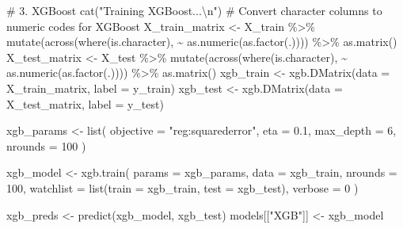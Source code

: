 \documentclass[
  letterpaper,
  DIV=11,
  numbers=noendperiod]{scrreprt}
\newenvironment{Shaded}{\begin{snugshade}}{\end{snugshade}}
\newcommand{\AttributeTok}[1]{\textcolor[rgb]{0.40,0.45,0.13}{#1}}
\newcommand{\CommentTok}[1]{\textcolor[rgb]{0.37,0.37,0.37}{#1}}
\newcommand{\DecValTok}[1]{\textcolor[rgb]{0.68,0.00,0.00}{#1}}
\newcommand{\FloatTok}[1]{\textcolor[rgb]{0.68,0.00,0.00}{#1}}
\newcommand{\FunctionTok}[1]{\textcolor[rgb]{0.28,0.35,0.67}{#1}}
\newcommand{\NormalTok}[1]{\textcolor[rgb]{0.00,0.23,0.31}{#1}}
\newcommand{\OtherTok}[1]{\textcolor[rgb]{0.00,0.23,0.31}{#1}}
\newcommand{\SpecialCharTok}[1]{\textcolor[rgb]{0.37,0.37,0.37}{#1}}
\newcommand{\StringTok}[1]{\textcolor[rgb]{0.13,0.47,0.30}{#1}}
\begin{document}
\begin{Shaded}
\begin{Highlighting}[]
  \CommentTok{\# 3. XGBoost}
  \FunctionTok{cat}\NormalTok{(}\StringTok{"Training XGBoost...}\SpecialCharTok{\textbackslash{}n}\StringTok{"}\NormalTok{)}
  \CommentTok{\# Convert character columns to numeric codes for XGBoost}
\NormalTok{  X\_train\_matrix }\OtherTok{\textless{}{-}}\NormalTok{ X\_train }\SpecialCharTok{\%\textgreater{}\%}
    \FunctionTok{mutate}\NormalTok{(}\FunctionTok{across}\NormalTok{(}\FunctionTok{where}\NormalTok{(is.character), }\SpecialCharTok{\textasciitilde{}} \FunctionTok{as.numeric}\NormalTok{(}\FunctionTok{as.factor}\NormalTok{(.)))) }\SpecialCharTok{\%\textgreater{}\%}
    \FunctionTok{as.matrix}\NormalTok{()}
\NormalTok{  X\_test\_matrix }\OtherTok{\textless{}{-}}\NormalTok{ X\_test }\SpecialCharTok{\%\textgreater{}\%}
    \FunctionTok{mutate}\NormalTok{(}\FunctionTok{across}\NormalTok{(}\FunctionTok{where}\NormalTok{(is.character), }\SpecialCharTok{\textasciitilde{}} \FunctionTok{as.numeric}\NormalTok{(}\FunctionTok{as.factor}\NormalTok{(.)))) }\SpecialCharTok{\%\textgreater{}\%}
    \FunctionTok{as.matrix}\NormalTok{()}
\NormalTok{  xgb\_train }\OtherTok{\textless{}{-}} \FunctionTok{xgb.DMatrix}\NormalTok{(}\AttributeTok{data =}\NormalTok{ X\_train\_matrix, }\AttributeTok{label =}\NormalTok{ y\_train)}
\NormalTok{  xgb\_test }\OtherTok{\textless{}{-}} \FunctionTok{xgb.DMatrix}\NormalTok{(}\AttributeTok{data =}\NormalTok{ X\_test\_matrix, }\AttributeTok{label =}\NormalTok{ y\_test)}
  
\NormalTok{  xgb\_params }\OtherTok{\textless{}{-}} \FunctionTok{list}\NormalTok{(}
    \AttributeTok{objective =} \StringTok{"reg:squarederror"}\NormalTok{,}
    \AttributeTok{eta =} \FloatTok{0.1}\NormalTok{,}
    \AttributeTok{max\_depth =} \DecValTok{6}\NormalTok{,}
    \AttributeTok{nrounds =} \DecValTok{100}
\NormalTok{  )}
  
\NormalTok{  xgb\_model }\OtherTok{\textless{}{-}} \FunctionTok{xgb.train}\NormalTok{(}
    \AttributeTok{params =}\NormalTok{ xgb\_params,}
    \AttributeTok{data =}\NormalTok{ xgb\_train,}
    \AttributeTok{nrounds =} \DecValTok{100}\NormalTok{,}
    \AttributeTok{watchlist =} \FunctionTok{list}\NormalTok{(}\AttributeTok{train =}\NormalTok{ xgb\_train, }\AttributeTok{test =}\NormalTok{ xgb\_test),}
    \AttributeTok{verbose =} \DecValTok{0}
\NormalTok{  )}
  
\NormalTok{  xgb\_preds }\OtherTok{\textless{}{-}} \FunctionTok{predict}\NormalTok{(xgb\_model, xgb\_test)}
\NormalTok{  models[[}\StringTok{"XGB"}\NormalTok{]] }\OtherTok{\textless{}{-}}\NormalTok{ xgb\_model}
  

\end{Highlighting}
\end{Shaded}
\end{document}
